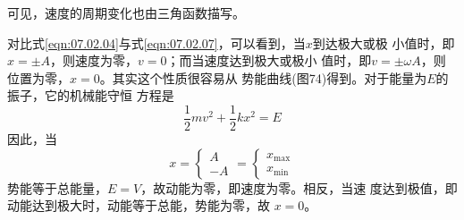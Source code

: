 可见，速度的周期变化也由三角函数描写。

对比式\eqref{eqn:07.02.04}与式\eqref{eqn:07.02.07}，可以看到，当$ x $到达极大或极
小值时，即$  x = \pm A   $，则速度为零，$  v = 0   $；而当速度达到极大或极小
值时，即$  v = \pm \omega A   $，则位置为零，$  x = 0   $。其实这个性质很容易从
势能曲线(图74)得到。对于能量为$ E $的振子，它的机械能守恒
方程是
\begin{equation*}
	\frac { 1 } { 2 } m v ^ { 2 } + \frac { 1 } { 2 } k x ^ { 2 } = E
\end{equation*}
因此，当
\begin{equation*}
	x =
	\begin{cases}
		A \\
		-A
	\end{cases}
	=
	\begin{cases}
		x _ { \max } \\
		x _ { \min }
	\end{cases}
\end{equation*}
势能等于总能量，$  E = V   $，故动能为零，即速度为零。相反，当速
度达到极值，即动能达到极大时，动能等于总能，势能为零，故
$ x = 0   $。
